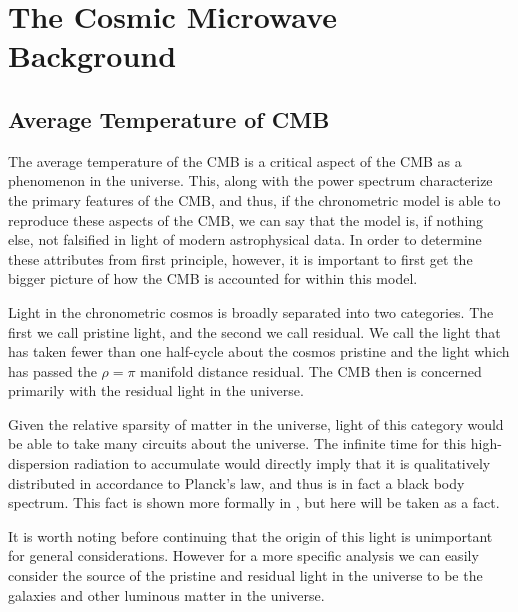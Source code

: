 \documentclass[a4paper]{article}
\begin{document}
    \newpage

    \section{\textbf{The Cosmic Microwave Background}}
    \subsection{Average Temperature of CMB}
    
    The average temperature of the CMB is a critical aspect of the CMB as a
    phenomenon in the universe. This, along with the power spectrum characterize
    the primary features of the CMB, and thus, if the chronometric model is able to
    reproduce these aspects of the CMB, we can say that the model is, if nothing
    else, not falsified in light of modern astrophysical data. In order to
    determine these attributes from first principle, however, it is important to
    first get the bigger picture of how the CMB is accounted for within this model.
    
    Light in the chronometric cosmos is broadly separated into two categories. The
    first we call pristine light, and the second we call residual. We call the
    light that has taken fewer than one half-cycle about the cosmos pristine and
    the light which has passed the $\rho = \pi$ manifold distance residual. The CMB
    then is concerned primarily with the residual light in the universe. 
    
    Given the relative sparsity of matter in the universe, light of this category
    would be able to take many circuits about the universe. The infinite time for
    this high-dispersion radiation to accumulate would directly imply that it is
    qualitatively distributed in accordance to Planck’s law, and thus is in fact a
    black body spectrum. This fact is shown more formally in \cite{segal_cmb},
    but here will be taken as a fact.
    
    It is worth noting before continuing that the origin of this light is
    unimportant for general considerations.  However for a more specific analysis
    we can easily consider the source of the pristine and residual  light in the
    universe to be the galaxies and other luminous matter in the universe. 

\end{document}
